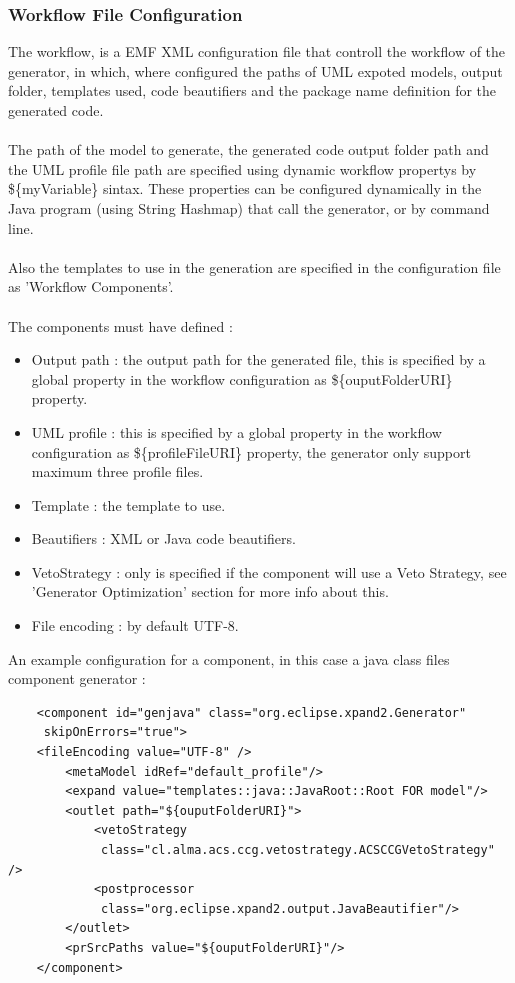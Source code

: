 \subsubsection{Workflow File Configuration}
The workflow, is a EMF XML configuration file that controll the workflow of the
generator, in which, where configured the paths of UML expoted models,
output folder, templates used, code beautifiers and the package name
definition for the generated code.\\
\\
The path of the model to generate, the generated code output folder path and
the UML profile file path are specified using dynamic workflow propertys by
\$\{myVariable\} sintax. These properties can be configured dynamically in the
Java program (using String Hashmap) that call the generator, or by command
line.\\
\\
Also the templates to use in the generation are specified in the configuration
file as 'Workflow Components'.\\
\\
The components must have defined :
\begin{itemize}
	\item Output path : the output path for the generated file, this is specified
	by a global property in the workflow configuration as \$\{ouputFolderURI\} 
	property.
	\item UML profile : this is specified by a global property in the workflow
	configuration as \$\{profileFileURI\} property, the generator only support
	maximum three profile files.
	\item Template : the template to use.
	\item Beautifiers : XML or Java code beautifiers.
	\item VetoStrategy : only is specified if the component will use a Veto
	Strategy, see 'Generator Optimization' section for more info about this.
	\item File encoding : by default UTF-8.
\end{itemize}

An example configuration for a component, in this case a java class files
component generator :
\begin{center}
\begin{verbatim}
    <component id="genjava" class="org.eclipse.xpand2.Generator"
     skipOnErrors="true"> 
    <fileEncoding value="UTF-8" />
        <metaModel idRef="default_profile"/>
        <expand value="templates::java::JavaRoot::Root FOR model"/>
        <outlet path="${ouputFolderURI}">
            <vetoStrategy
             class="cl.alma.acs.ccg.vetostrategy.ACSCCGVetoStrategy" /> 
            <postprocessor 
             class="org.eclipse.xpand2.output.JavaBeautifier"/>
        </outlet>
        <prSrcPaths value="${ouputFolderURI}"/>
    </component> 
\end{verbatim}
\end{center}


